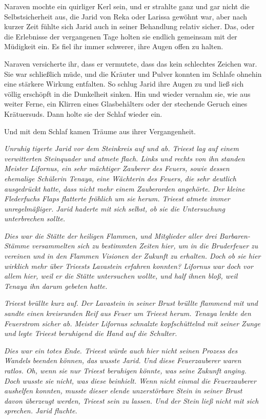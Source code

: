 Naraven mochte ein quirliger Kerl sein, und er strahlte ganz und gar nicht die Selbstsicherheit aus, die Jarid von Reka oder Larissa gewöhnt war, aber nach kurzer Zeit fühlte sich Jarid auch in seiner Behandlung relativ sicher. Das, oder die Erlebnisse der vergangenen Tage holten sie endlich gemeinsam mit der Müdigkeit ein. Es fiel ihr immer schwerer, ihre Augen offen zu halten.

Naraven versicherte ihr, dass er vermutete, dass das kein schlechtes Zeichen war. Sie war schließlich müde, und die Kräuter und Pulver konnten im Schlafe ohnehin eine stärkere Wirkung entfalten. So schlug Jarid ihre Augen zu und ließ sich völlig erschöpft in die Dunkelheit sinken. Hin und wieder vernahm sie, wie aus weiter Ferne, ein Klirren eines Glasbehälters oder der stechende Geruch eines Krätuersuds. Dann holte sie der Schlaf wieder ein.

Und mit dem Schlaf kamen Träume aus ihrer Vergangenheit.\bigskip







\textit{Unruhig tigerte Jarid vor dem Steinkreis auf und ab. Trieest lag auf einem verwitterten Steinquader und atmete flach. Links und rechts von ihn standen Meister Lifornus, ein sehr mächtiger Zauberer des Feuers, sowie dessen ehemalige Schülerin Tenaya, eine Wächterin des Feuers, die sehr deutlich ausgedrückt hatte, dass nicht mehr einem Zauberorden angehörte. Der kleine Flederfuchs Flaps flatterte fröhlich um sie herum. Trieest atmete immer unregelmäßiger. Jarid haderte mit sich selbst, ob sie die Untersuchung unterbrechen sollte.}

\textit{Dies war die Stätte der heiligen Flammen, und Mitglieder aller drei Barbaren-Stämme versammelten sich zu bestimmten Zeiten hier, um in die Bruderfeuer zu vereinen und in den Flammen Visionen der Zukunft zu erhalten. Doch ob sie hier wirklich mehr über Trieests Lavastein erfahren konnten? Lifornus war doch vor allem hier, weil er die Stätte untersuchen wollte, und half ihnen bloß, weil Tenaya ihn darum gebeten hatte.}

\textit{Trieest brüllte kurz auf. Der Lavastein in seiner Brust brüllte flammend mit und sandte einen kreisrunden Reif aus Feuer um Trieest herum. Tenaya lenkte den Feuerstrom sicher ab. Meister Lifornus schnalzte kopfschüttelnd mit seiner Zunge und legte Trieest beruhigend die Hand auf die Schulter.}

\textit{Dies war ein totes Ende. Trieest würde auch hier nicht seinen Prozess des Wandels beenden können, das wusste Jarid. Und diese Feuerzauberer waren ratlos. Oh, wenn sie nur Trieest beruhigen könnte, was seine Zukunft anging. Doch wusste sie nicht, was diese beinhielt. Wenn nicht einmal die Feuerzauberer aushelfen konnten, musste dieser elende unzerstörbare Stein in seiner Brust davon überzeugt werden, Trieest sein zu lassen. Und der Stein ließ nicht mit sich sprechen. Jarid fluchte.}\bigskip



